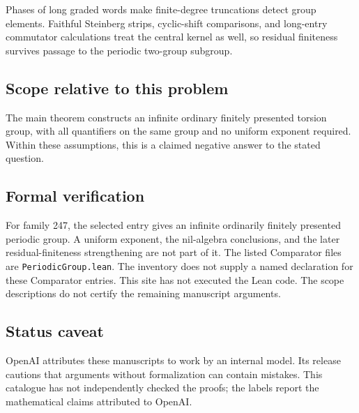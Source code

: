 \documentclass[11pt]{article}
\begin{document}
Phases of long graded words make finite-degree truncations detect group elements. Faithful Steinberg strips, cyclic-shift comparisons, and long-entry commutator calculations treat the central kernel as well, so residual finiteness survives passage to the periodic two-group subgroup.

\subsection{Scope relative to this problem}
The main theorem constructs an infinite ordinary finitely presented torsion group, with all quantifiers on the same group and no uniform exponent required. Within these assumptions, this is a claimed negative answer to the stated question.

\subsection{Formal verification}
For family 247, the selected entry gives an infinite ordinarily finitely presented periodic group. A uniform exponent, the nil-algebra conclusions, and the later residual-finiteness strengthening are not part of it. The listed Comparator files are \texttt{PeriodicGroup.lean}. The inventory does not supply a named declaration for these Comparator entries. This site has not executed the Lean code. The scope descriptions do not certify the remaining manuscript arguments.

\subsection{Status caveat}
OpenAI attributes these manuscripts to work by an internal model. Its release cautions that arguments without formalization can contain mistakes. This catalogue has not independently checked the proofs; the labels report the mathematical claims attributed to OpenAI.
\end{document}
